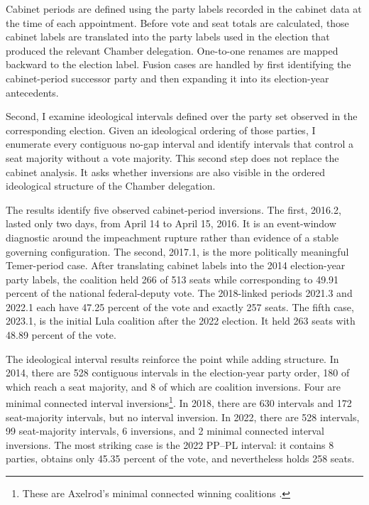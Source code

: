 \documentclass[11pt]{article}
\begin{document}
Cabinet periods are defined using the party labels recorded in the cabinet
data at the time of each appointment. Before vote and seat totals are
calculated, those cabinet labels are translated into the party labels used in
the election that produced the relevant Chamber delegation. One-to-one
renames are mapped backward to the election label. Fusion cases are handled
by first identifying the cabinet-period successor party and then expanding it
into its election-year antecedents.

Second, I examine ideological intervals defined over the party set observed in
the corresponding election. Given an ideological ordering of those parties, I
enumerate every contiguous no-gap interval and identify intervals that control
a seat majority without a vote majority. This second step does not replace the
cabinet analysis. It asks whether inversions are also visible in the ordered
ideological structure of the Chamber delegation.

The results identify five observed cabinet-period inversions. The first, 2016.2,
lasted only two days, from April 14 to April 15,
2016. It is an event-window diagnostic around the impeachment rupture rather
than evidence of a stable governing configuration. The second, 2017.1, is the
more politically meaningful Temer-period case. After translating cabinet labels into the 2014 election-year party labels,
the coalition held 266 of 513 seats while corresponding to 49.91 percent of
the national federal-deputy vote. The 2018-linked periods 2021.3 and 2022.1
each have 47.25 percent of the vote and exactly 257 seats. The fifth case,
2023.1, is the initial Lula coalition after the 2022 election. It held 263 seats
with 48.89 percent of the vote.

The ideological interval results reinforce the point while adding structure.
In 2014, there are 528 contiguous intervals in the election-year party order,
180 of which reach a seat majority, and 8 of which are coalition inversions. Four are minimal connected
interval inversions\footnote{These are Axelrod's minimal connected winning coalitions \parencite{axelrod1970conflict}.}. In 2018, there are 630 intervals and 172 seat-majority intervals,
but no interval inversion. In 2022, there are 528 intervals, 99 seat-majority
intervals, 6 inversions, and 2 minimal connected interval inversions. The most striking
case is the 2022 PP--PL interval: it contains 8 parties, obtains only 45.35
percent of the vote, and nevertheless holds 258 seats.
\end{document}
